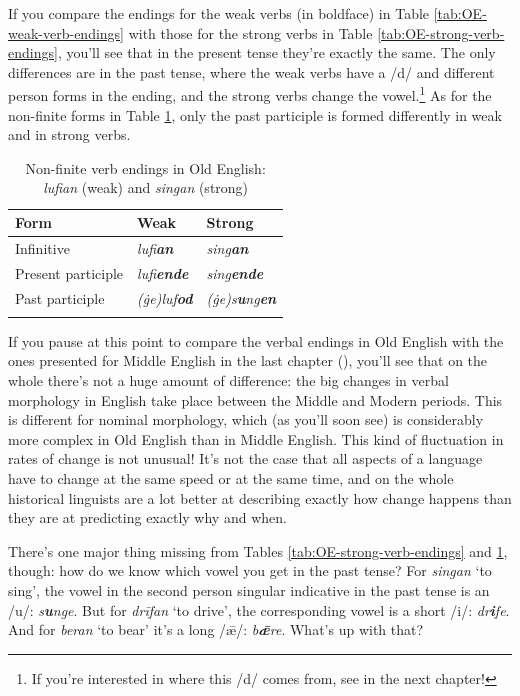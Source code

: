 \noindent If you compare the endings for the weak verbs (in boldface) in Table \ref{tab:OE-weak-verb-endings} with those for the strong verbs in Table \ref{tab:OE-strong-verb-endings}, you'll see that in the present tense they're exactly the same. The only differences are in the past tense, where the weak verbs have a /d/ and different person forms in the ending, and the strong verbs change the vowel.\footnote{If you're interested in where this /d/ comes from, see  in the next chapter!} As for the non-finite forms in Table \ref{tab:OE-nonfinite-verbs}, only the past participle is formed differently in weak and in strong verbs.

\begin{table}
    \caption{Non-finite verb endings in Old English:  \emph{lufian} (weak) and \emph{singan} (strong)}\label{tab:OE-nonfinite-verbs}
  \begin{tabularx}{\textwidth}{XXl}
\lsptoprule
 Form & Weak & Strong \\
    \midrule
    Infinitive & \emph{lufi\textbf{an}} & \emph{sing\textbf{an}} \\
    Present participle & \emph{lufi\textbf{ende}} & \emph{sing\textbf{ende}} \\
    Past participle & \emph{(ġe)luf\textbf{od}} & \emph{(ġe)s\textbf{u}ng\textbf{en}} \\
    \lspbottomrule
  \end{tabularx}
\end{table}

\noindent If you pause at this point to compare the verbal endings in Old English with the ones presented for Middle English in the last chapter (), you'll see that on the whole there's not a huge amount of difference: the big changes in verbal morphology in English take place between the Middle and Modern periods. This is different for nominal morphology, which (as you'll soon see) is considerably more complex in Old English than in Middle English. This kind of fluctuation in rates of change is not unusual! It's not the case that all aspects of a language have to change at the same speed or at the same time, and on the whole historical linguists are a lot better at describing exactly how change happens than they are at predicting exactly why and when.

There's one major thing missing from Tables \ref{tab:OE-strong-verb-endings} and \ref{tab:OE-nonfinite-verbs}, though: how do we know which vowel you get in the past tense? For \emph{singan} `to sing', the vowel in the second person singular indicative in the past tense is an /u/: \emph{s\textbf{u}nge}. But for \emph{drīfan} `to drive', the corresponding vowel is a short /i/: \emph{dr\textbf{i}fe}. And for \emph{beran} `to bear' it's a long /ǣ/: \emph{b\textbf{ǣ}re}. What's up with that?

